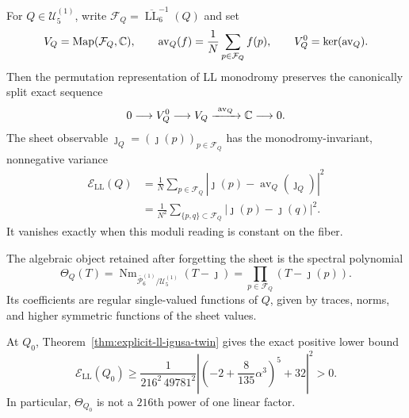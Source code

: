 \begin{proposition}
\label{prop:ll-forgetting-energy}
For $Q\in\mathcal U_5^{(1)}$, write
$\mathcal F_Q=\overline{\operatorname{LL}}_6^{-1}(Q)$ and set
\begin{equation}
 V_Q=\operatorname{Map}(\mathcal F_Q,\mathbb{C}),
 \qquad
 \operatorname{av}_Q(f)=\frac1N\sum_{p\in\mathcal F_Q}f(p),
 \qquad
 V_Q^0=\ker(\operatorname{av}_Q).
 \label{eq:ll-averaging-space}
\end{equation}
Then the permutation representation of LL monodromy preserves the canonically
split exact sequence
\begin{equation}
 0\longrightarrow V_Q^0\longrightarrow V_Q
 \xrightarrow{\ \operatorname{av}_Q\ }\mathbb{C}\longrightarrow0.
 \label{eq:ll-averaging-exact-sequence}
\end{equation}
The sheet observable $\jmath_Q=(\jmath(p))_{p\in\mathcal F_Q}$ has the
monodromy-invariant, nonnegative variance
\begin{align}
 \mathcal E_{\mathrm{LL}}(Q)
 &=\frac1N\sum_{p\in\mathcal F_Q}
   \left|\jmath(p)-\operatorname{av}_Q(\jmath_Q)\right|^2
 \label{eq:ll-forgetting-energy}\\
 &=\frac1{N^2}\sum_{\{p,q\}\subset\mathcal F_Q}
   |\jmath(p)-\jmath(q)|^2.
 \label{eq:ll-forgetting-energy-pairwise}
\end{align}
It vanishes exactly when this moduli reading is constant on the fiber.

The algebraic object retained after forgetting the sheet is the spectral
polynomial
\begin{equation}
 \Theta_Q(T)
 =\operatorname{Nm}_{\overline{\mathcal P}_6^{(1)}/\mathcal U_5^{(1)}}
   (T-\jmath)
 =\prod_{p\in\mathcal F_Q}(T-\jmath(p)).
 \label{eq:ll-moduli-spectral-polynomial}
\end{equation}
Its coefficients are regular single-valued functions of $Q$, given by traces,
norms, and higher symmetric functions of the sheet values.

At $Q_0$, Theorem~\ref{thm:explicit-ll-igusa-twin} gives the exact positive
lower bound
\begin{equation}
 \mathcal E_{\mathrm{LL}}(Q_0)
 \ge
 \frac{1}{216^2\,49781^2}
 \left|
  \left(-2+\frac8{135}\alpha^3\right)^5+32
 \right|^2
 >0.
 \label{eq:ll-forgetting-energy-lower-bound}
\end{equation}
In particular, $\Theta_{Q_0}$ is not a $216$th power of one linear factor.
\end{proposition}

